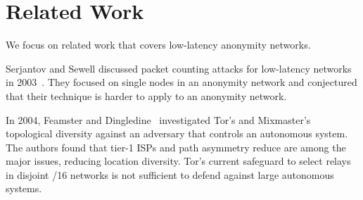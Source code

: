 \section{Related Work}
\label{sec:related}

We focus on related work that covers low-latency anonymity networks.

Serjantov and Sewell discussed packet counting attacks for low-latency networks
in 2003~\cite{Serjantov2003a}.  They focused on single nodes in an anonymity
network and conjectured that their technique is harder to apply to an anonymity
network.

In 2004, Feamster and Dingledine~\cite{Feamster2004a} investigated Tor's and
Mixmaster's topological diversity against an adversary that controls an
autonomous system.  The authors found that tier-1 ISPs and path asymmetry reduce
are among the major issues, reducing location diversity.  Tor's current
safeguard to select relays in disjoint /16 networks is not sufficient to defend
against large autonomous systems.

\cite{Mathewson2004a}
\cite{Murdoch2005a}
\cite{Murdoch2007a}
\cite{Mittal2011a}
\cite{Wacek2013a}
\cite{Johnson2013a}
